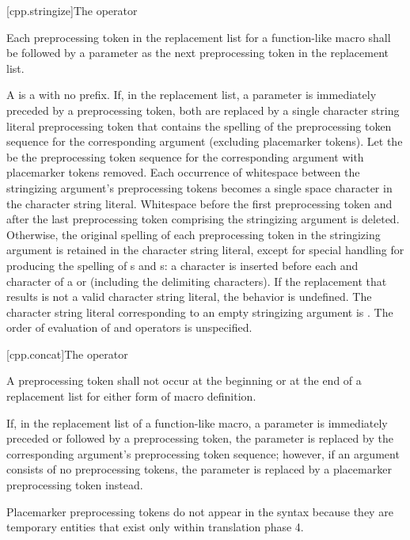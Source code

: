 [cpp.stringize]{The \tcode{\#} operator}%
%

\pnum
Each
\tcode{\#}
preprocessing token in the replacement list for a function-like
macro shall be followed by a parameter as the next preprocessing
token in the replacement list.

\pnum
A  is a  with no prefix.
If, in the replacement list, a parameter is immediately
preceded by a
\tcode{\#}
preprocessing token,
both are replaced by a single character string literal preprocessing token that
contains the spelling of the preprocessing token sequence for the
corresponding argument (excluding placemarker tokens).
Let the  be the preprocessing token sequence
for the corresponding argument with placemarker tokens removed.
Each occurrence of whitespace between the stringizing argument's preprocessing
tokens becomes a single space character in the character string literal.
Whitespace before the first preprocessing token and after the last
preprocessing token comprising the stringizing argument is deleted.
Otherwise, the original spelling of each preprocessing token in the
stringizing argument is retained in the character string literal,
except for special handling for producing the spelling of
s and s:
a
\tcode{\textbackslash}
character is inserted before each
and
\tcode{\textbackslash}
character of a  or 
(including the delimiting
characters).
If the replacement that results is not a valid character string literal,
the behavior is undefined. The character string literal corresponding to
an empty stringizing argument is .
The order of evaluation of
\tcode{\#}
and
\tcode{\#\#}
operators is unspecified.

[cpp.concat]{The \tcode{\#\#} operator}%
%

\pnum
A
\tcode{\#\#}
preprocessing token shall not occur at the beginning or
at the end of a replacement list for either form
of macro definition.

\pnum
If, in the replacement list of a function-like macro, a parameter is
immediately preceded or followed by a
\tcode{\#\#}
preprocessing token, the parameter is replaced by the
corresponding argument's preprocessing token sequence; however, if an argument consists of no preprocessing tokens, the parameter is
replaced by a placemarker preprocessing token instead.
\begin{footnote}
Placemarker preprocessing tokens do not appear in the syntax
because they are temporary entities that exist only within translation phase 4.
\end{footnote}

